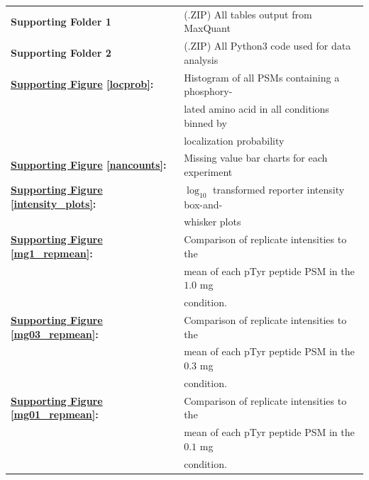 \documentclass[journal=jprobs,manuscript=article]{achemso}
\begin{document}
\begin{table}[h!]
\begin{tabular}{ll}
	\textbf{Supporting Folder 1} & (.ZIP) All tables output from MaxQuant \\

	\textbf{Supporting Folder 2} & (.ZIP) All Python3 code used for data analysis \\

        \textbf{\hyperref[locprob]{Supporting Figure} \ref{locprob}:} & Histogram of all PSMs containing a phosphory- \\
                                                                                                                & lated amino acid in all conditions binned by \\
                                                                                                                & localization probability \\

       \textbf{\hyperref[nancounts]{Supporting Figure} \ref{nancounts}:} & Missing value bar charts for each experiment \\

        \textbf{\hyperref[intensity_plots]{Supporting Figure} \ref{intensity_plots}:} & $\log_{10}$ transformed reporter intensity box-and- \\
                                                                                                                                   & whisker plots \\

	\textbf{\hyperref[mg1_repmean]{Supporting Figure} \ref{mg1_repmean}:} & Comparison of replicate intensities to the\\
													    & mean of each pTyr peptide PSM in the $1.0$ mg\\
													    & condition. \\

	\textbf{\hyperref[mg03_repmean]{Supporting Figure} \ref{mg03_repmean}:} & Comparison of replicate intensities to the\\
													    & mean of each pTyr peptide PSM in the $0.3$ mg\\
													    & condition. \\

	\textbf{\hyperref[mg01_repmean]{Supporting Figure} \ref{mg01_repmean}:} & Comparison of replicate intensities to the\\
													    & mean of each pTyr peptide PSM in the $0.1$ mg\\
													    & condition. \\
        

\end{tabular}
\end{table}
\end{document}
